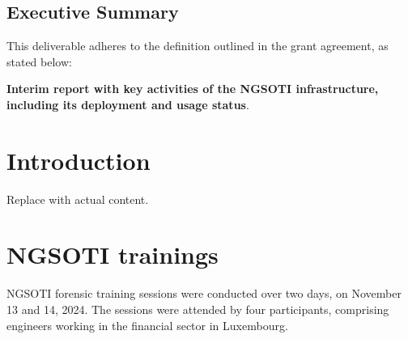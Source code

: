 \section*{Executive Summary}

This deliverable adheres to the definition outlined in the grant agreement, as stated below:

\textbf{ Interim report with key activities of the NGSOTI infrastructure, including its deployment and usage status}.


\chapter{Introduction}
Replace with actual content.

\chapter{NGSOTI trainings}
NGSOTI forensic training sessions were conducted over two days, on November 13 and 14, 2024. The sessions were attended by four participants, comprising engineers working in the financial sector in Luxembourg.

